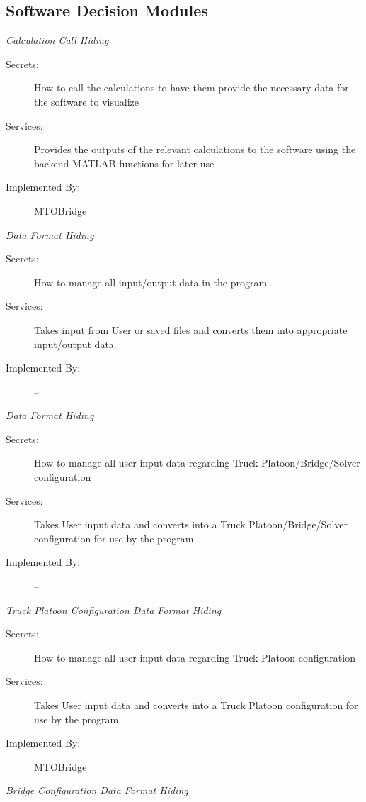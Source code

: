 \documentclass[12pt, titlepage]{article}
\begin{document}
\subsection{Software Decision Modules}
    \emph{{\large Calculation Call Hiding}}
    \begin{description}
        \item[Secrets:] How to call the calculations to have them provide the necessary data for the software to visualize
        \item[Services:]Provides the outputs of the relevant calculations to the software using the backend MATLAB functions for later use
        \item[Implemented By:] MTOBridge\\
    \end{description}
    \emph{{\large Data Format Hiding}}
    \begin{description}
        \item[Secrets:]How to manage all input/output data in the program
        \item[Services:]Takes input from User or saved files and converts them into appropriate input/output data.
        \item[Implemented By:] --\\
    \end{description}
    \emph{{\large Data Format Hiding}}
    \begin{description}
        \item[Secrets:]How to manage all user input data regarding Truck Platoon/Bridge/Solver configuration
        \item[Services:]Takes User input data and converts into a Truck Platoon/Bridge/Solver configuration for use by the program
        \item[Implemented By:] --\\
    \end{description}
    \emph{{\large Truck Platoon Configuration Data Format Hiding}}
    \begin{description}
        \item[Secrets:]How to manage all user input data regarding Truck Platoon configuration
        \item[Services:]Takes User input data and converts into a Truck Platoon configuration for use by the program
        \item[Implemented By:] MTOBridge\\
    \end{description}
    \emph{{\large Bridge Configuration Data Format Hiding}}
\end{document}
